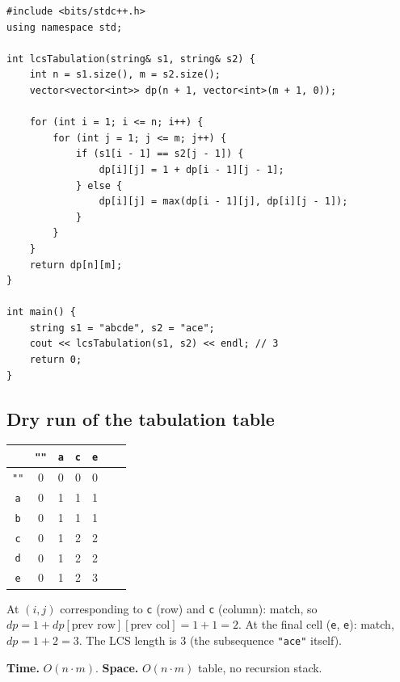 \begin{lstlisting}
#include <bits/stdc++.h>
using namespace std;

int lcsTabulation(string& s1, string& s2) {
    int n = s1.size(), m = s2.size();
    vector<vector<int>> dp(n + 1, vector<int>(m + 1, 0));

    for (int i = 1; i <= n; i++) {
        for (int j = 1; j <= m; j++) {
            if (s1[i - 1] == s2[j - 1]) {
                dp[i][j] = 1 + dp[i - 1][j - 1];
            } else {
                dp[i][j] = max(dp[i - 1][j], dp[i][j - 1]);
            }
        }
    }
    return dp[n][m];
}

int main() {
    string s1 = "abcde", s2 = "ace";
    cout << lcsTabulation(s1, s2) << endl; // 3
    return 0;
}
\end{lstlisting}

\subsection*{Dry run of the tabulation table}


\begin{center}
\begin{tabular}{c|c|c|c|c|c|c}
 & \texttt{""} & \texttt{a} & \texttt{c} & \texttt{e} \\ \hline
\texttt{""} & 0 & 0 & 0 & 0 \\ \hline
\texttt{a} & 0 & 1 & 1 & 1 \\ \hline
\texttt{b} & 0 & 1 & 1 & 1 \\ \hline
\texttt{c} & 0 & 1 & 2 & 2 \\ \hline
\texttt{d} & 0 & 1 & 2 & 2 \\ \hline
\texttt{e} & 0 & 1 & 2 & 3
\end{tabular}
\end{center}

At $(i,j)$ corresponding to \texttt{c} (row) and \texttt{c} (column):
match, so $\textit{dp}=1+\textit{dp}[\text{prev row}][\text{prev col}]=1+1=2$.
At the final cell (\texttt{e}, \texttt{e}): match, $\textit{dp}=1+2=3$.
The LCS length is $3$ (the subsequence \texttt{"ace"} itself).

\begin{complexitybox}
\textbf{Time.} $O(n \cdot m)$.
\textbf{Space.} $O(n \cdot m)$ table, no recursion stack.
\end{complexitybox}


